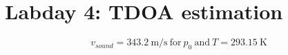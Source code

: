 \documentclass[final]{scrreprt} %
\begin{document}
\chapter{Labday 4: TDOA estimation}
\label{ch:labday4}

\begin{equation}
v_{sound} = \SI{343.2}{\meter\per\second}~\mathrm{for}~p_0~\mathrm{and}~T = \SI{293.15}{\kelvin}
\end{equation}
\end{document}
